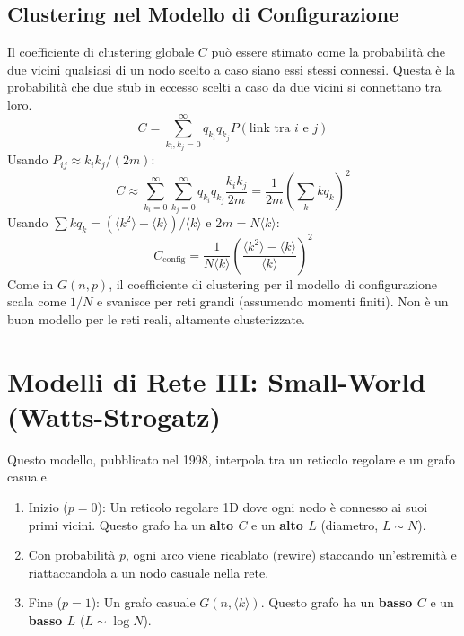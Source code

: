 \subsection{Clustering nel Modello di Configurazione}
Il coefficiente di clustering globale $C$ può essere stimato come la probabilità che due vicini qualsiasi di un nodo scelto a caso siano essi stessi connessi.
Questa è la probabilità che due stub in eccesso scelti a caso da due vicini si connettano tra loro.
\begin{equation}
 C = \sum_{k_i, k_j=0}^\infty q_{k_i} q_{k_j} P(\text{link tra } i \text{ e } j)
\end{equation}
Usando $P_{ij} \approx k_i k_j / (2m)$:
\begin{equation}
 C \approx \sum_{k_i=0}^\infty \sum_{k_j=0}^\infty q_{k_i} q_{k_j} \frac{k_i k_j}{2m} = \frac{1}{2m} \left( \sum_k k q_k \right)^2
\end{equation}
Usando $\sum k q_k = (\langle k^2 \rangle - \langle k \rangle) / \langle k \rangle$ e $2m = N \langle k \rangle$:
\begin{equation}
C_{\text{config}} = \frac{1}{N \langle k \rangle} \left( \frac{\langle k^2 \rangle - \langle k \rangle}{\langle k \rangle} \right)^2
\end{equation}
Come in $G(n,p)$, il coefficiente di clustering per il modello di configurazione scala come $1/N$ e svanisce per reti grandi (assumendo momenti finiti). Non è un buon modello per le reti reali, altamente clusterizzate.

\section{Modelli di Rete III: Small-World (Watts-Strogatz)}
Questo modello, pubblicato nel 1998, interpola tra un reticolo regolare e un grafo casuale.
\begin{enumerate}
\item Inizio ($p=0$): Un reticolo regolare 1D dove ogni nodo è connesso ai suoi primi vicini. Questo grafo ha un \textbf{alto $C$} e un \textbf{alto $L$} (diametro, $L \sim N$).
\item Con probabilità $p$, ogni arco viene ricablato (rewire)  staccando un'estremità e riattaccandola a un nodo casuale nella rete.
\item Fine ($p=1$): Un grafo casuale $G(n, \langle k \rangle)$. Questo grafo ha un \textbf{basso $C$} e un \textbf{basso $L$} ($L \sim \log N$).
\end{enumerate}

